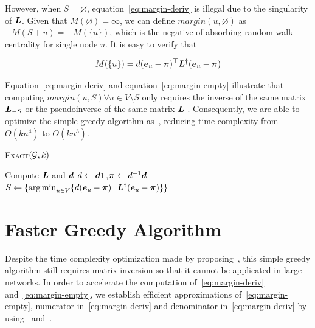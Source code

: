 \documentclass[sigconf]{acmart}
\begin{document}
However, when \(S=\varnothing\), equation~\eqref{eq:margin-deriv} is illegal due to the singularity of \(\boldsymbol{L}\). Given that \(M(\varnothing)=\infty\), we can define \(margin(u,\varnothing)\) as \(-M(S+u)=-M(\{u\})\), which is the negative of absorbing random-walk centrality for single node \(u\). It is easy to verify that~\cite{ZhXuZh20}

\begin{equation}\label{eq:margin-empty}
    M(\{u\})=d(\boldsymbol{e}_u-\boldsymbol{\pi})^\top\boldsymbol{L}^\dagger(\boldsymbol{e}_u-\boldsymbol{\pi})
\end{equation}

Equation~\eqref{eq:margin-deriv} and equation~\eqref{eq:margin-empty} illustrate that computing \(margin(u,S)\forall u\in V\setminus S\) only requires the inverse of the same matrix \(\boldsymbol{L}_{-S}\) or the pseudoinverse of the same matrix \(\boldsymbol{L}\) . Consequently, we are able to optimize the simple greedy algorithm as~, reducing time complexity from \(O(kn^4)\) to \(O(kn^3)\).

\begin{algorithm}
    \caption{\textsc{Exact}\((\mathcal{G},k)\)}
    \label{algo:exact}
    Compute \(\boldsymbol{L}\) and \(\boldsymbol{d}\)\;
    \(d\gets\boldsymbol{d}\boldsymbol{1}\),\(\boldsymbol{\pi}\gets d^{-1}\boldsymbol{d}\)\;
    \(S\gets\{\operatorname*{arg\,min}_{u\in V}\{d(\boldsymbol{e}_u-\boldsymbol{\pi})^\top\boldsymbol{L}^\dagger(\boldsymbol{e}_u-\boldsymbol{\pi})\}\}\)\;
\end{algorithm}

\section{Faster Greedy Algorithm}

Despite the time complexity optimization made by proposing~, this simple greedy algorithm still requires matrix inversion so that it cannot be applicated in large networks. In order to accelerate the computation of~\eqref{eq:margin-deriv} and~\eqref{eq:margin-empty}, we establish efficient approximations of~\eqref{eq:margin-empty}, numerator in~\eqref{eq:margin-deriv} and denominator in~\eqref{eq:margin-deriv} by using~ and~.
\end{document}
